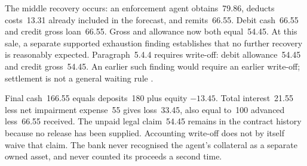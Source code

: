 The middle recovery occurs: an enforcement agent obtains~79.86, deducts
costs~13.31 already included in the forecast, and remits~66.55.
Debit cash~66.55 and credit gross loan~66.55. Gross and allowance now both
equal~54.45. At this sale, a separate supported exhaustion finding establishes
that no further recovery is reasonably expected. Paragraph~5.4.4 requires
write-off: debit allowance~54.45 and credit gross~54.45. An earlier such
finding would require an earlier write-off; settlement is not a general
waiting rule \citep[paragraph~5.4.4]{aasb9dated}.

Final cash~166.55 equals deposits~180 plus equity $-13.45$. Total interest~21.55
less net impairment expense~55 gives loss~33.45, also equal to~100 advanced
less~66.55 received. The unpaid legal claim~54.45 remains in the contract
history because no release has been supplied. Accounting write-off does not
by itself waive that claim. The bank never recognised the agent's collateral
as a separate owned asset, and never counted its proceeds a second time.
 
